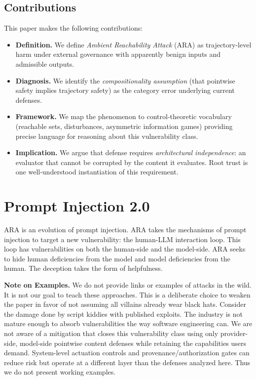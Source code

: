 \documentclass[11pt]{article}
\theoremstyle{definition}
\theoremstyle{plain}
\theoremstyle{remark}
\begin{document}
\subsection*{Contributions}

This paper makes the following contributions:

\begin{itemize}[leftmargin=2em]
\item \textbf{Definition.} We define \emph{Ambient Reachability Attack} (ARA) as trajectory-level harm under external governance with apparently benign inputs and admissible outputs.

\item \textbf{Diagnosis.} We identify the \emph{compositionality assumption} (that pointwise safety implies trajectory safety) as the category error underlying current defenses.

\item \textbf{Framework.} We map the phenomenon to control-theoretic vocabulary (reachable sets, disturbances, asymmetric information games) providing precise language for reasoning about this vulnerability class.

\item \textbf{Implication.} We argue that defense requires \emph{architectural independence}: an evaluator that cannot be corrupted by the content it evaluates. Root trust is one well-understood instantiation of this requirement.
\end{itemize}

\section{Prompt Injection 2.0}

ARA is an evolution of prompt injection. ARA takes the mechanisms of prompt injection to target a new vulnerability: the human-LLM interaction loop. This loop has vulnerabilities on both the human-side and the model-side. ARA seeks to hide human deficiencies from the model and model deficiencies from the human. The deception takes the form of helpfulness.

\medskip
\noindent\textbf{Note on Examples.} We do not provide links or examples of attacks in the wild. It is not our goal to teach these approaches. This is a deliberate choice to weaken the paper in favor of not assuming all villains already wear black hats. Consider the damage done by script kiddies with published exploits. The industry is not mature enough to absorb vulnerabilities the way software engineering can. We are not aware of a mitigation that closes this vulnerability class using only provider-side, model-side pointwise content defenses while retaining the capabilities users demand. System-level actuation controls and provenance/authorization gates can reduce risk but operate at a different layer than the defenses analyzed here. Thus we do not present working examples.
\end{document}
